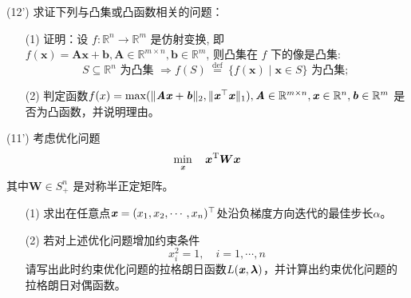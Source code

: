 \documentclass[12pt,a4paper,openany,twoside]{ctexbook}
\begin{document}
\begin{exercise}(12')
	求证下列与凸集或凸函数相关的问题：
	\begin{itemize}
		\item[(1)] 证明：设 $f: \mathbb{R}^{n} \rightarrow \mathbb{R}^{m}$ 是仿射变换, 即 $f(\boldsymbol{x})=\boldsymbol{A} \boldsymbol{x}+\boldsymbol{b}, \boldsymbol{A} \in \mathbb{R}^{m \times n}, \boldsymbol{b} \in \mathbb{R}^{m}$, 则凸集在 $f$ 下的像是凸集:
		$$
		S \subseteq \mathbb{R}^{n} \text { 为凸集 } \Rightarrow f(S) \stackrel{\text { def }}{=}\{f(\boldsymbol{x}) \mid \boldsymbol{x} \in S\} \text { 为凸集; }
		$$
		\item [(2)] 判定函数$f(x)=\max(\|\boldsymbol{\mathit{A}}\boldsymbol{\mathit{x}}+\boldsymbol{\mathit{b}}\|_2,\|\boldsymbol{\mathit{x}}^\top \boldsymbol{\mathit{x}}\|_1),\boldsymbol{\mathit{A}}\in \mathbb{R}^{m\times n}, \boldsymbol{\mathit{x}}\in \mathbb{R}^{n}, \boldsymbol{\mathit{b}}\in \mathbb{R}^m$ 是否为凸函数，并说明理由。
	\end{itemize}
\end{exercise}

\begin{exercise}(11')
	考虑优化问题
	$$
	\min_{\boldsymbol{\mathit{x}}} \quad \boldsymbol{x}^{\mathrm{T}} \boldsymbol{W} \boldsymbol{x}
	$$
	其中$\boldsymbol{W} \in S_+^{n}$ 是对称半正定矩阵。
	
	\begin{itemize}
		\item [(1)] 求出在任意点$ \boldsymbol{\mathit{x}} = (x_1,x_2,\cdots,x_n)^\top $处沿负梯度方向迭代的最佳步长$\alpha$。
		\item[(2)] 若对上述优化问题增加约束条件
		$$x_{i}^{2}=1, \quad i=1, \cdots, n$$
		请写出此时约束优化问题的拉格朗日函数$ L(\boldsymbol{\mathit{x}},\boldsymbol{\lambda}) $，并计算出约束优化问题的拉格朗日对偶函数。
	\end{itemize}
\end{exercise}
\end{document}
